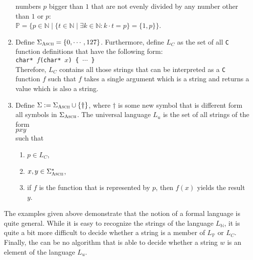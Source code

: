 \begin{enumerate}
      numbers $p$ bigger than $1$ that are not evenly divided by any number other than $1$ or $p$:
      \\[0.2cm]
      \hspace*{1.3cm}
      $\mathbb{P} = \bigl\{ p \in \mathbb{N} \;\big|\; \{ t \in \mathbb{N} \mid \exists k \in
      \mathbb{N} : k \cdot t = p \} = \{1, p\} \bigr\}$.
\item Define $\Sigma_{\textsc{\scriptsize Ascii}} = \{ 0, \cdots, 127\}$.  Furthermore, define $L_C$
      as the set of all \texttt{C} function definitions that have the following form:
      \\[0.2cm]
      \hspace*{1.3cm}
      \texttt{char* $f$(char* $x$) \{ $\cdots$ \}}
      \\[0.2cm]
      Therefore,  $L_C$ contains all those strings that can be interpreted as a \texttt{C} function $f$
      such that $f$ takes a single argument which is a string and returns a value which is also a
      string.
\item Define $\Sigma := \Sigma_{\textsc{\scriptsize Ascii}} \cup \{\texttt{\dag}\}$, where
      $\mathtt{\dag}$ is some new symbol that is different form all symbols in
      $\Sigma_{\textsc{\scriptsize Ascii}}$.
      The universal language $L_u$ is the set of all strings of the form
      \\[0.2cm]
      \hspace*{1.3cm}
      \texttt{$p$\dag$x$\dag$y$}
      \\[0.2cm]
      such that
      \begin{enumerate}
      \item $p \in L_C$,
      \item $x,y \in \Sigma_{\textsc{Ascii}}^*$,
      \item if $f$ is the function that is represented by $p$, then $f(x)$ yields the result $y$.
            \eox
      \end{enumerate}
\end{enumerate}
The examples given above demonstrate that the notion of a formal language is quite general.
While it is easy to recognize the strings of the language $L_\mathbb{N}$, it is quite a bit more
difficult to decide whether a string is a member of 
$L_\mathbb{P}$ or $L_C$.  Finally, the can be no algorithm that is able to decide whether a string
$w$ is an element of the language $L_u$. 
\pagebreak


